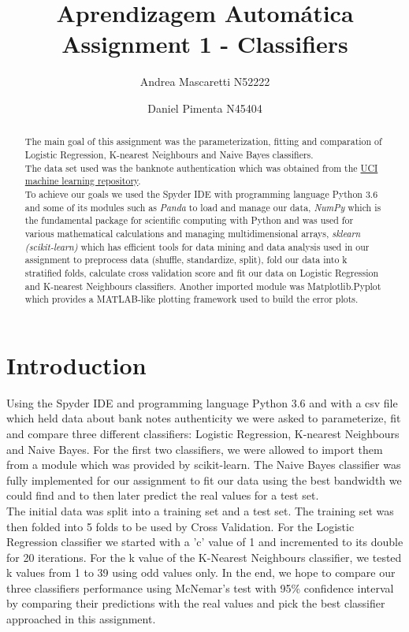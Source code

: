 \documentclass[a4paper]{article}
\title{\textbf{Aprendizagem Automática} \\
\large Assignment 1 - Classifiers}
\author{Andrea Mascaretti N52222\and Daniel Pimenta N45404}
\begin{document}
\maketitle

\begin{abstract}
The main goal of this assignment was the parameterization, fitting and comparation of Logistic Regression,
 K-nearest Neighbours and Naive Bayes classifiers.\\ 
The data set used was the banknote authentication which was obtained from the
 \href{https://archive.ics.uci.edu/ml/datasets/banknote+authentication}{UCI machine learning repository}.\\
To achieve our goals we used the Spyder IDE with programming language Python 3.6 and some of its modules 
such as \textit{Panda} to load and manage our data, \textit{NumPy} which is the fundamental package for 
scientific computing with Python and was used for various mathematical calculations and managing multidimensional 
arrays, \textit{sklearn (scikit-learn)} which has efficient tools for data mining and data analysis used in our assignment 
to preprocess data (shuffle, standardize, split), fold our data into k stratified folds, calculate cross validation score and 
fit our data on Logistic Regression and K-nearest Neighbours classifiers. Another imported module was Matplotlib.Pyplot
 which provides a MATLAB-like plotting framework used to build the error plots. 
\end{abstract}

\section{Introduction}
Using the Spyder IDE and programming language Python 3.6 and with a csv file which held data about bank notes authenticity 
we were asked to parameterize, fit and compare three different classifiers: Logistic Regression, K-nearest Neighbours and Naive Bayes. 
For the first two classifiers, we were allowed to import them from a module which was provided by scikit-learn. 
The Naive Bayes classifier was fully implemented for our assignment to fit our data using the best bandwidth we could find and to then later predict the real values
for a test set.\\
The initial data was split into a training set and a test set. The training set was then folded into 5 folds to be used by Cross Validation.
For the Logistic Regression classifier we started with a 'c' value of 1 and incremented to its double for 20 iterations.
For the k value of the K-Nearest Neighbours classifier, we tested k values from 1 to 39 using odd values only. 
In the end, we hope to compare our three classifiers performance using McNemar's test with 95\%  confidence interval 
by comparing their predictions with the real values and pick the best classifier approached in this assignment.
\end{document}
